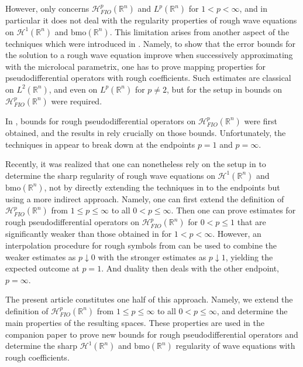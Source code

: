 \documentclass{amsart}
\newcommand {\bmo}{\mathrm{bmo}}
\newcommand {\HT}{\mathcal{H}}
\newcommand {\Hp}{\mathcal{H}^{p}_{FIO}(\Rn)}
\newcommand {\Rn}{\mathbb{R}^{n}}
\theoremstyle{definition}
\numberwithin{equation}{section}
\begin{document}
However, \cite{Hassell-Rozendaal23} only concerns $\Hp$ and $L^{p}(\Rn)$ for $1<p<\infty$, and in particular it does not deal with the regularity properties of rough wave equations on $\HT^{1}(\Rn)$ and $\bmo(\Rn)$. This limitation arises from another aspect of the techniques which were introduced in \cite{Smith98b}. Namely, to show that the error bounds for the solution to a rough wave equation improve when successively approximating with the microlocal parametrix, one has to prove mapping properties for pseudodifferential operators with rough coefficients. Such estimates are classical on $L^{2}(\Rn)$, and even on $L^{p}(\Rn)$ for $p\neq 2$, but for the setup in \cite{Hassell-Rozendaal23} bounds on $\Hp$ were required. 

In \cite{Rozendaal23a,Rozendaal22}, bounds for rough pseudodifferential operators on $\Hp$ were first obtained, and the results in \cite{Hassell-Rozendaal23} rely crucially on those bounds. Unfortunately, the techniques in \cite{Rozendaal23a,Rozendaal22} appear to break down at the endpoints $p=1$ and $p=\infty$. 

Recently, it was realized that one can nonetheless rely on the setup in \cite{Hassell-Rozendaal23} to determine the sharp regularity of rough wave equations on $\HT^{1}(\Rn)$ and $\bmo(\Rn)$, not by directly extending the techniques in \cite{Rozendaal23a,Rozendaal22} to the endpoints but using a more indirect approach. Namely, one can first extend the definition of $\Hp$ from $1\leq p\leq\infty$ to all $0<p\leq \infty$. Then one can prove estimates for rough pseudodifferential operators on $\Hp$ for $0<p\leq 1$ that are significantly weaker than those obtained in \cite{Rozendaal23a,Rozendaal22} for $1<p<\infty$. However, an interpolation procedure for rough symbols from \cite{Rozendaal22} can be used to combine the weaker estimates as $p\downarrow 0$ with the stronger estimates as $p\downarrow 1$, yielding the expected outcome at $p=1$. And duality then deals with the other endpoint, $p=\infty$. 

The present article constitutes one half of this approach. Namely, we extend the definition of $\Hp$ from $1\leq p\leq\infty$ to all $0<p\leq \infty$, and determine the main properties of the resulting spaces. These properties are used in the companion paper \cite{LiRoSo25a} to prove new bounds for rough pseudodifferential operators and determine the sharp $\HT^{1}(\Rn)$ and $\bmo(\Rn)$ regularity of wave equations with rough coefficients.
\end{document}

